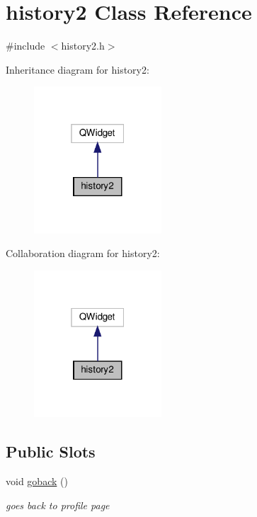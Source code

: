 \hypertarget{classhistory2}{}\section{history2 Class Reference}
\label{classhistory2}


{\ttfamily \#include $<$history2.\+h$>$}



Inheritance diagram for history2\+:
\nopagebreak
\begin{figure}[H]
\begin{center}
\leavevmode
\includegraphics[width=135pt]{classhistory2__inherit__graph}
\end{center}
\end{figure}


Collaboration diagram for history2\+:
\nopagebreak
\begin{figure}[H]
\begin{center}
\leavevmode
\includegraphics[width=135pt]{classhistory2__coll__graph}
\end{center}
\end{figure}
\subsection*{Public Slots}
\begin{DoxyCompactItemize}
\item 
void \hyperlink{classhistory2_a7c8bc802fee335ca7eb2ecf3cc441034}{goback} ()
\begin{DoxyCompactList}\small\item\em goes back to profile page \end{DoxyCompactList}\end{DoxyCompactItemize}
